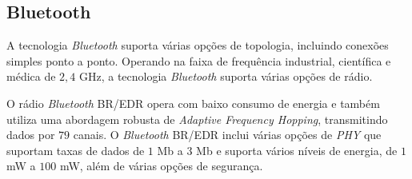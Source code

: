 \subsection{Bluetooth}
A  tecnologia \emph{Bluetooth}  suporta várias opções de topologia, incluindo conexões simples ponto a ponto. Operando na faixa de frequência industrial, científica e médica de $2,4$ GHz, a tecnologia \emph{Bluetooth} suporta várias opções de rádio.

O rádio \emph{Bluetooth} BR/EDR opera com baixo consumo de energia e também utiliza uma abordagem robusta de \textit{Adaptive Frequency Hopping}, transmitindo dados por $79$ canais. O \textit{Bluetooth} BR/EDR inclui várias opções de \textit{PHY} que suportam taxas de dados de $1$ Mb a $3$ Mb e suporta vários níveis de energia, de $1$mW a $100$ mW, além de várias opções de segurança.

